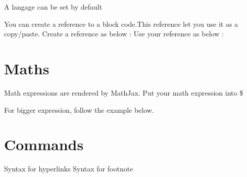A langage can be set by default
\code{{{
  \set[defaultcodelanguage=python]
}}}

You can create a reference to a block code.This reference
let you use it as a copy/paste.
Create a reference as below :
Use your reference as below :

\section{Maths}
Math expressions are rendered by MathJax.
Put your math expression into \$

For bigger expression, follow the example below.
\code{{{
  \[
   \left \{ \begin[t]{array}{l}
              0!=1 \\
              n! = n \times (n-1)! \text{ for } n>0
            \end{array} \right.
  \]
}}}

\section{Commands}
Syntax for hyperlinks
Syntax for footnote
